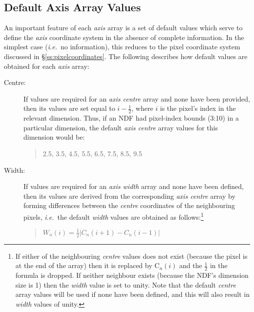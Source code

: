 \documentclass[twoside,11pt,nolof]{starlink}
\providecommand{\st}[1]{{\emph{#1}}}
\begin{document}
\subsection{\label{ss:axisdefaults}Default Axis Array Values}

An important feature of each \st{axis\/} array is a set of default values
which serve to define the \st{axis\/} coordinate system in the absence of
complete information.
In the simplest case (\st{i.e.}\ no information), this reduces to the pixel
coordinate system discussed in \S\ref{ss:pixelcoordinates}.
The following describes how default values are obtained for each \st{axis\/} array:

\begin{description}

\item[Centre:]
If values are required for an \st{axis centre\/} array and none have been
provided, then its values are set equal to $i-\frac{1}{2}$, where $i$ is the
pixel's index in the relevant dimension.
Thus, if an NDF had pixel-index bounds (3:10) in a particular dimension, the
default \st{axis centre\/} array values for this dimension would be:

\small
\begin{quote}
\begin{center}
2.5, 3.5, 4.5, 5.5, 6.5, 7.5, 8.5, 9.5
\end{center}
\end{quote}
\normalsize

\item[Width:]
If values are required for an \st{axis width\/} array and none have been
defined, then its values are derived from the corresponding \st{axis
centre\/} array by forming differences between the \st{centre\/}
coordinates of the neighbouring pixels, \st{i.e.}\ the default \st{
width\/} values are obtained as follows:\footnote{If either of the
neighbouring \st{centre\/} values does not exist (because the pixel is at
the end of the array) then it is replaced by C$_{n}(i)$ and the
$\frac{1}{2}$ in the formula is dropped. If neither neighbour exists
(because the NDF's dimension size is 1) then the \st{width\/} value is set
to unity.
Note that the default \st{centre\/} array values will be used if none have
been defined, and this will also result in \st{width\/} values of unity.}

\small
\begin{quote}
\begin{center}
$W_{n}(i) = \frac{1}{2} |C_n(i+1) - C_{n}(i-1)|$
\end{center}
\end{quote}
\normalsize


\end{description}
\end{document}
